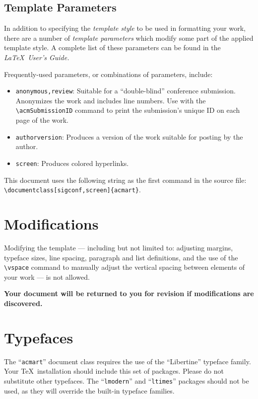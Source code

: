 \documentclass[sigconf]{acmart}
\begin{document}
	\subsection{Template Parameters}
	
	In addition to specifying the {\it template style} to be used in formatting your work, there are a number of {\it template parameters} which modify some part of the applied template style. A complete list of these parameters can be found in the {\it \LaTeX\ User's Guide.}
	
	Frequently-used parameters, or combinations of parameters, include:
	\begin{itemize}
		\item {\verb|anonymous,review|}: Suitable for a ``double-blind'' conference submission. Anonymizes the work and includes line numbers. Use with the \verb|\acmSubmissionID| command to print the submission's unique ID on each page of the work.
		\item{\verb|authorversion|}: Produces a version of the work suitable for posting by the author.
		\item{\verb|screen|}: Produces colored hyperlinks.
	\end{itemize}
	
	This document uses the following string as the first command in the source file: \verb|\documentclass[sigconf,screen]{acmart}|.
	
	\section{Modifications}
	
	Modifying the template --- including but not limited to: adjusting margins, typeface sizes, line spacing, paragraph and list definitions, and the use of the \verb|\vspace| command to manually adjust the vertical spacing between elements of your work --- is not allowed.
	
	{\bf Your document will be returned to you for revision if modifications are discovered.}
	
	\section{Typefaces}
	
	The ``\verb|acmart|'' document class requires the use of the ``Libertine'' typeface family. Your \TeX\ installation should include this set of packages. Please do not substitute other typefaces. The ``\verb|lmodern|'' and ``\verb|ltimes|'' packages should not be used, as they will override the built-in typeface families.
	
\end{document}
